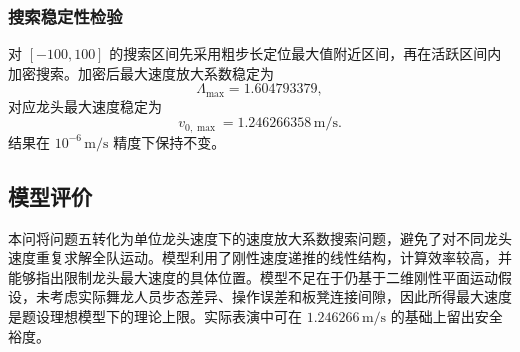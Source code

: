 \subsubsection{搜索稳定性检验}

对 $[-100,100]$ 的搜索区间先采用粗步长定位最大值附近区间，再在活跃区间内加密搜索。加密后最大速度放大系数稳定为
\[
    \Lambda_{\max}=1.604793379,
\]
对应龙头最大速度稳定为
\[
    v_{0,\max}=1.246266358\,\mathrm{m/s}.
\]
结果在 $10^{-6}\,\mathrm{m/s}$ 精度下保持不变。

\subsection{模型评价}

本问将问题五转化为单位龙头速度下的速度放大系数搜索问题，避免了对不同龙头速度重复求解全队运动。模型利用了刚性速度递推的线性结构，计算效率较高，并能够指出限制龙头最大速度的具体位置。模型不足在于仍基于二维刚性平面运动假设，未考虑实际舞龙人员步态差异、操作误差和板凳连接间隙，因此所得最大速度是题设理想模型下的理论上限。实际表演中可在 $1.246266\,\mathrm{m/s}$ 的基础上留出安全裕度。
